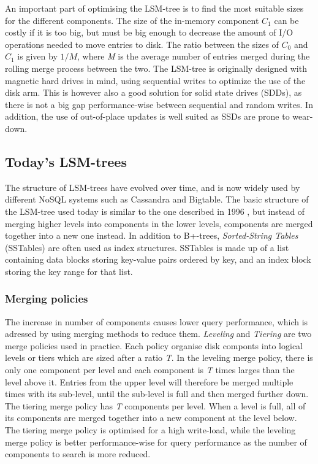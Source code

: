 An important part of optimising the LSM-tree is to find the most suitable sizes for the different components. The size of the in-memory component $C_1$ can be costly if it is too big, but must be big enough to decrease the amount of I/O operations needed to move entries to disk. The ratio between the sizes of $C_0$ and $C_1$ is given by $1/M$, where \emph{M} is the average number of entries merged during the rolling merge process between the two. The LSM-tree is originally designed with magnetic hard drives in mind, using sequential writes to optimize the use of the disk arm. This is however also a good solution for solid state drives (SDDs), as there is not a big gap performance-wise between sequential and random writes. In addition, the use of out-of-place updates is well suited as SSDs are prone to wear-down\cite{LSMSDD}.

\subsection{Today's LSM-trees}
The structure of LSM-trees have evolved over time, and is now widely used by different NoSQL systems such as Cassandra\cite{Cassandra} and Bigtable\cite{Bigtable}. The basic structure of the LSM-tree used today is similar to the one described in 1996 \cite{LSMTree}, but instead of merging higher levels into components in the lower levels, components are merged together into a new one instead\cite{LSMSurvey}. In addition to B+-trees, \emph{Sorted-String Tables} (SSTables) are often used as index structures. SSTables is made up of a list containing data blocks storing key-value pairs ordered by key, and an index block storing the key range for that list. 

\subsubsection{Merging policies}

The increase in number of components causes lower query performance, which is adressed by using merging methods to reduce them. \emph{Leveling} and \emph{Tiering} are two merge policies used in practice. Each policy organise disk componts into logical levels or tiers which are sized after a ratio \emph{T}. In the leveling merge policy, there is only one component per level and each component is \emph{T} times larges than the level above it. Entries from the upper level will therefore be merged multiple times with its sub-level, until the sub-level is full and then merged further down. The tiering merge policy has \emph{T} components per level. When a level is full, all of its components are merged together into a new component at the level below. The tiering merge policy is optimised for a high write-load, while the leveling merge policy is better performance-wise for query performance as the number of components to search is more reduced\cite{LSMSurvey}. 

